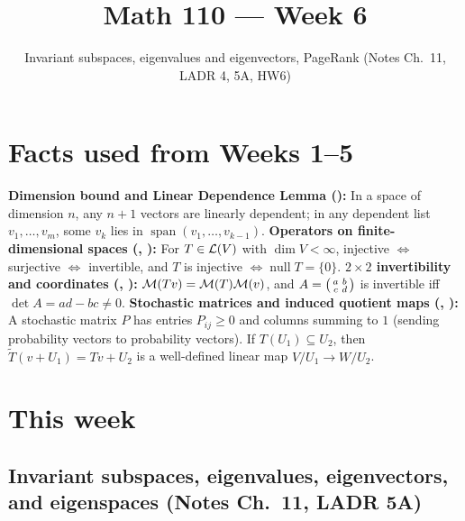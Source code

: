 \documentclass[10pt]{scrartcl}
\title{Math 110 --- Week 6}
\subtitle{Invariant subspaces, eigenvalues and eigenvectors, PageRank (Notes Ch.~11, LADR 4, 5A, HW6)}
\author{}\date{}\ihead{}
\DeclareMathOperator{\spn}{span}\DeclareMathOperator{\nul}{null}\DeclareMathOperator{\range}{range}
\begin{document}
\maketitle

\section{Facts used from Weeks 1--5}
\begin{enumerate}[label=(W\arabic*),leftmargin=2.8em,itemsep=4pt]
  \ii{} \textbf{Dimension bound and Linear Dependence Lemma ():} In a space of dimension $n$, any $n+1$ vectors are linearly dependent; in any dependent list $v_1,\dots,v_m$, some $v_k$ lies in $\spn(v_1,\dots,v_{k-1})$.
  \ii{} \textbf{Operators on finite-dimensional spaces (, ):} For $T\in\mathcal L(V)$ with $\dim V<\infty$, injective $\iff$ surjective $\iff$ invertible, and $T$ is injective $\iff\nul T=\{0\}$.
  \ii{} \textbf{$2\times 2$ invertibility and coordinates (, ):} $\mathcal M(Tv)=\mathcal M(T)\mathcal M(v)$, and $A=\begin{psmallmatrix}a&b\\c&d\end{psmallmatrix}$ is invertible iff $\det A=ad-bc\ne 0$.
  \ii{} \textbf{Stochastic matrices and induced quotient maps (, ):} A stochastic matrix $P$ has entries $P_{ij}\ge 0$ and columns summing to $1$ (sending probability vectors to probability vectors). If $T(U_1)\subseteq U_2$, then $\widetilde T(v+U_1)=Tv+U_2$ is a well-defined linear map $V/U_1\to W/U_2$.
\end{enumerate}

\section{This week}

\subsection{Invariant subspaces, eigenvalues, eigenvectors, and eigenspaces (Notes Ch.~11, LADR 5A)}
\end{document}
